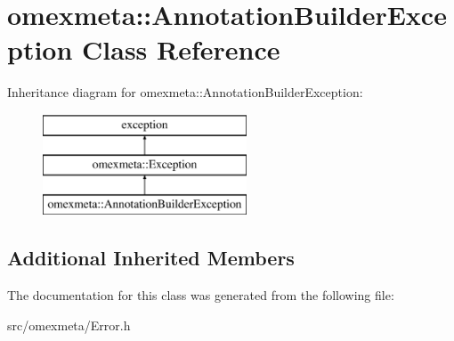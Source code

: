 \hypertarget{classomexmeta_1_1AnnotationBuilderException}{}\section{omexmeta\+:\+:Annotation\+Builder\+Exception Class Reference}
\label{classomexmeta_1_1AnnotationBuilderException}
Inheritance diagram for omexmeta\+:\+:Annotation\+Builder\+Exception\+:\begin{figure}[H]
\begin{center}
\leavevmode
\includegraphics[height=3.000000cm]{classomexmeta_1_1AnnotationBuilderException}
\end{center}
\end{figure}
\subsection*{Additional Inherited Members}


The documentation for this class was generated from the following file\+:\begin{DoxyCompactItemize}
\item 
src/omexmeta/Error.\+h\end{DoxyCompactItemize}
